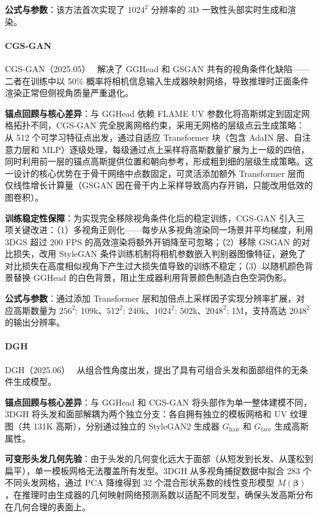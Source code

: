 \textbf{公式与参数}：该方法首次实现了 $1024^2$ 分辨率的 3D 一致性头部实时生成和渲染。

\paragraph{CGS-GAN}

CGS-GAN（2025.05）~\cite{2505_17590} 解决了 GGHead 和 GSGAN 共有的视角条件化缺陷——二者在训练中以 50\% 概率将相机信息输入生成器映射网络，导致推理时正面条件渲染正常但侧视角质量严重退化。

\textbf{锚点回顾与核心差异}：与 GGHead 依赖 FLAME UV 参数化将高斯绑定到固定网格拓扑不同，CGS-GAN 完全脱离网格约束，采用无网格的层级点云生成策略：从 512 个可学习特征点出发，通过自适应 Transformer 块（包含 AdaIN 层、自注意力层和 MLP）逐级处理，每级通过点上采样将高斯数量扩展为上一级的四倍，同时利用前一层的锚点高斯提供位置和朝向参考，形成粗到细的层级生成策略。这一设计的核心优势在于骨干网络中点数固定，可灵活添加额外 Transformer 层而仅线性增长计算量（GSGAN 因在骨干内上采样导致高内存开销，只能改用低效的图卷积）。

\textbf{训练稳定性保障}：为实现完全移除视角条件化后的稳定训练，CGS-GAN 引入三项关键改进：（1）多视角正则化——每步从多视角渲染同一场景并平均梯度，利用 3DGS 超过 200 FPS 的高效渲染将额外开销降至可忽略；（2）移除 GSGAN 的对比损失，改用 StyleGAN 条件训练机制将相机参数嵌入判别器图像特征，避免了对比损失在高度相似视角下产生过大损失值导致的训练不稳定；（3）以随机颜色背景替换 GGHead 的白色背景，阻止生成器利用背景颜色制造白色空洞伪影。

\textbf{公式与参数}：通过添加 Transformer 层和加倍点上采样因子实现分辨率扩展，对应高斯数量为 $256^2$: 109k、$512^2$: 240k、$1024^2$: 502k、$2048^2$: 1M，支持高达 $2048^2$ 的输出分辨率。

\paragraph{DGH}

DGH（2025.06）~\cite{2506_20875} 从组合性角度出发，提出了具有可组合头发和面部组件的无条件生成模型。

\textbf{锚点回顾与核心差异}：与 GGHead 和 CGS-GAN 将头部作为单一整体建模不同，3DGH 将头发和面部解耦为两个独立分支：各自拥有独立的模板网格和 UV 纹理图（共 131K 高斯），分别通过独立的 StyleGAN2 生成器 $G_{\mathrm{hair}}$ 和 $G_{\mathrm{face}}$ 生成高斯属性。

\textbf{可变形头发几何先验}：由于头发的几何变化远大于面部（从短发到长发、从蓬松到扁平），单一模板网格无法覆盖所有发型。3DGH 从多视角捕捉数据中拟合 283 个不同头发网格，通过 PCA 降维得到 32 个混合形状系数的线性变形模型 $M(\boldsymbol{\beta})$，在推理时由生成器的几何映射网络预测系数以适配不同发型，确保头发高斯分布在几何合理的表面上。


